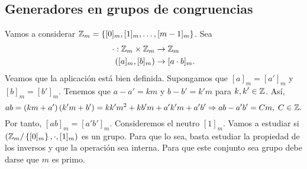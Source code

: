 \subsection{Generadores en grupos de congruencias}
Vamos a considerar $\displaystyle \mathbb{Z}_{m} = \left\{ [0]_{m}, [1]_{m}, \ldots, [m - 1]_{m}\right\}  $. Sea 
\[
\begin{split}
	\cdot : \mathbb{Z}_{m}\times \mathbb{Z}_{m} & \to \mathbb{Z}_{m} \\
	\left([a]_{m},[b]_{m}\right) & \to [a \cdot b]_{m}.
\end{split}
\]
Veamos que la aplicación está bien definida. Supongamos que $\displaystyle [a]_{m} = [a']_{m} $ y $\displaystyle [b]_{m} = [b']_{m} $. Tenemos que $\displaystyle a - a' = km  $ y $\displaystyle b -b' = k'm $ para $\displaystyle k,k' \in \mathbb{Z} $. Así,
\[ab = \left(km + a'\right)\left(k'm+b'\right) = k k' m^{2} + kb'm + a'k'm + a'b' \Rightarrow ab - a'b' = Cm, \; C \in \mathbb{Z} .\]
Por tanto, $\displaystyle [ab]_{m} = [a'b']_{m} $. Consideremos el neutro $\displaystyle [1]_{m} $. Vamos a estudiar si $\displaystyle \left(\mathbb{Z}_{m}/ \left\{ [0]_{m}\right\} , \cdot , [1]_{m}\right) $ es un grupo. Para que lo sea, basta estudiar la propiedad de los inversos y que la operación sea interna. Para que este conjunto sea grupo debe darse que $\displaystyle m $ es primo. 

